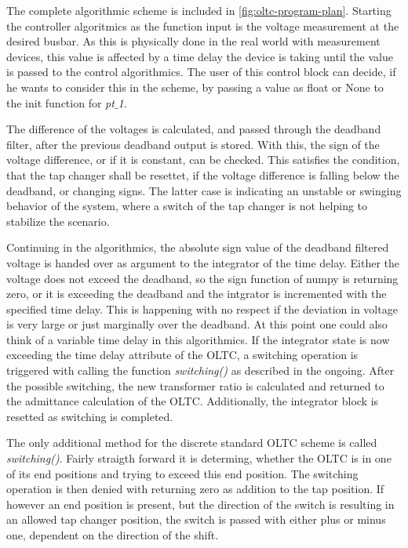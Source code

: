 The complete algorithmic scheme is included in \autoref{fig:oltc-program-plan}.
Starting the controller algoritmics as the function input is the voltage measurement at the desired busbar.
As this is physically done in the real world with measurement devices, this value is affected by a time delay the device is taking until the value is passed to the control algorithmics.
The user of this control block can decide, if he wants to consider this in the scheme, by passing a value as float or None to the init function for \textit{pt$\_$1}.

The difference of the voltages is calculated, and passed through the deadband filter, after the previous deadband output is stored.
With this, the sign of the voltage difference, or if it is constant, can be checked.
This satisfies the condition, that the tap changer shall be resettet, if the voltage difference is falling below the deadband, or changing signs.
The latter case is indicating an unstable or swinging behavior of the system, where a switch of the tap changer is not helping to stabilize the scenario.

Continuing in the algorithmics, the absolute sign value of the deadband filtered voltage is handed over as argument to the integrator of the time delay.
Either the voltage does not exceed the deadband, so the sign function of numpy is returning zero, or it is exceeding the deadband and the intgrator is incremented with the specified time delay. 
This is happening with no respect if the deviation in voltage is very large or just marginally over the deadband.
At this point one could also think of a variable time delay in this algorithmics.
If the integrator state is now exceeding the time delay attribute of the \acs{OLTC}, a switching operation is triggered with calling the function \textit{switching()} as described in the ongoing.
After the possible switching, the new transformer ratio is calculated and returned to the admittance calculation of the \acs{OLTC}.
Additionally, the integrator block is resetted as switching is completed.

The only additional method for the discrete standard \acs{OLTC} scheme is called \textit{switching()}.
Fairly straigth forward it is determing, whether the \acs{OLTC} is in one of its end positions and trying to exceed this end position.
The switching operation is then denied with returning zero as addition to the tap position.
If however an end position is present, but the direction of the switch is resulting in an allowed tap changer position, the switch is passed with either plus or minus one, dependent on the direction of the shift.

